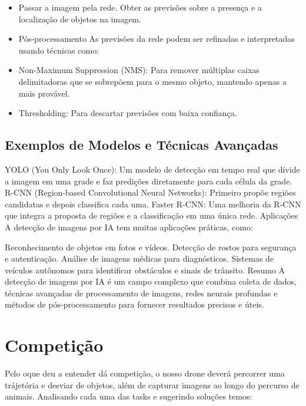 \documentclass[a4paper,12pt]{article} %
\begin{document}
\begin{itemize}
\item Passar a imagem pela rede.
Obter as previsões sobre a presença e a localização de objetos na imagem.
\item Pós-processamento
As previsões da rede podem ser refinadas e interpretadas usando técnicas como:

\item Non-Maximum Suppression (NMS): Para remover múltiplas caixas delimitadoras que se sobrepõem para o mesmo objeto, mantendo apenas a mais provável.
\item Thresholding: Para descartar previsões com baixa confiança.
\end{itemize}
\subsection{Exemplos de Modelos e Técnicas Avançadas}
YOLO (You Only Look Once): Um modelo de detecção em tempo real que divide a imagem em uma grade e faz predições diretamente para cada célula da grade.
R-CNN (Region-based Convolutional Neural Networks): Primeiro propõe regiões candidatas e depois classifica cada uma.
Faster R-CNN: Uma melhoria da R-CNN que integra a proposta de regiões e a classificação em uma única rede.
Aplicações
A detecção de imagens por IA tem muitas aplicações práticas, como:

Reconhecimento de objetos em fotos e vídeos.
Detecção de rostos para segurança e autenticação.
Análise de imagens médicas para diagnósticos.
Sistemas de veículos autônomos para identificar obstáculos e sinais de trânsito.
Resumo
A detecção de imagens por IA é um campo complexo que combina coleta de dados, técnicas avançadas de processamento de imagens, redes neurais profundas e métodos de pós-processamento para fornecer resultados precisos e úteis.

\section{Competição}

Pelo oque deu a entender dá competição, o nosso drone deverá percorrer uma trájetória e desviar de objetos, além de capturar imagens ao longo do percurso de animais. Analisando cada uma das tasks e sugerindo soluções temos:
 
\end{document}
